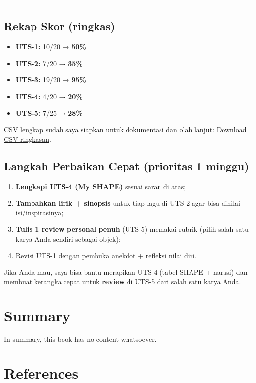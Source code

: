 \documentclass[
  letterpaper,
  DIV=11,
  numbers=noendperiod]{scrreprt}
\providecommand{\tightlist}{%
  \setlength{\itemsep}{0pt}\setlength{\parskip}{0pt}}
\begin{document}
\begin{center}\rule{0.5\linewidth}{0.5pt}\end{center}

\section{Rekap Skor (ringkas)}\label{rekap-skor-ringkas-1}

\begin{itemize}
\tightlist
\item
  \textbf{UTS-1:} 10/20 → \textbf{50\%}
\item
  \textbf{UTS-2:} 7/20 → \textbf{35\%}
\item
  \textbf{UTS-3:} 19/20 → \textbf{95\%}
\item
  \textbf{UTS-4:} 4/20 → \textbf{20\%}
\item
  \textbf{UTS-5:} 7/25 → \textbf{28\%}
\end{itemize}

CSV lengkap sudah saya siapkan untuk dokumentasi dan olah lanjut:
\href{sandbox:/mnt/data/UTS_self_assessment.csv}{Download CSV
ringkasan}.

\section{Langkah Perbaikan Cepat (prioritas 1
minggu)}\label{langkah-perbaikan-cepat-prioritas-1-minggu}

\begin{enumerate}
\def\labelenumi{\arabic{enumi}.}
\tightlist
\item
  \textbf{Lengkapi UTS-4 (My SHAPE)} sesuai saran di atas;
\item
  \textbf{Tambahkan lirik + sinopsis} untuk tiap lagu di UTS-2 agar bisa
  dinilai isi/inspirasinya;
\item
  \textbf{Tulis 1 review personal penuh} (UTS-5) memakai rubrik (pilih
  salah satu karya Anda sendiri sebagai objek);
\item
  Revisi UTS-1 dengan pembuka anekdot + refleksi nilai diri.
\end{enumerate}

Jika Anda mau, saya bisa bantu merapikan UTS-4 (tabel SHAPE + narasi)
dan membuat kerangka cepat untuk \textbf{review} di UTS-5 dari salah
satu karya Anda.


\chapter{Summary}\label{summary}

In summary, this book has no content whatsoever.


\chapter*{References}\label{references}


\label{refs}
\end{document}
